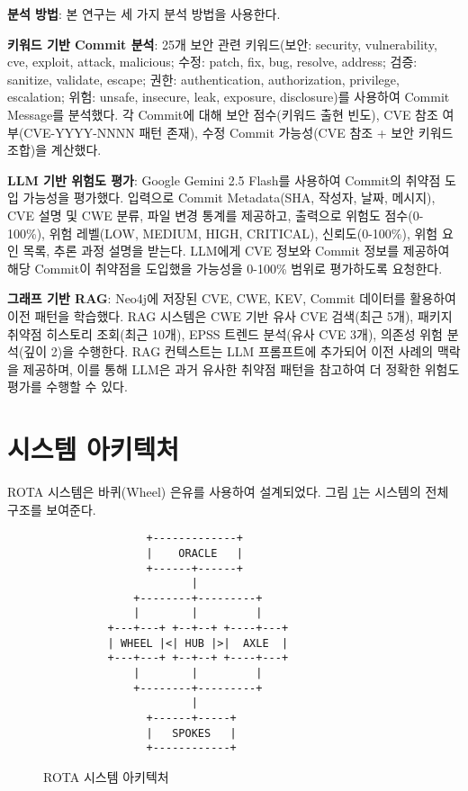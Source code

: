 ﻿\documentclass[conference]{IEEEtran}
\begin{document}
\textbf{분석 방법}: 본 연구는 세 가지 분석 방법을 사용한다.

\textbf{키워드 기반 Commit 분석}: 25개 보안 관련 키워드(보안: security, vulnerability, cve, exploit, attack, malicious; 수정: patch, fix, bug, resolve, address; 검증: sanitize, validate, escape; 권한: authentication, authorization, privilege, escalation; 위험: unsafe, insecure, leak, exposure, disclosure)를 사용하여 Commit Message를 분석했다. 각 Commit에 대해 보안 점수(키워드 출현 빈도), CVE 참조 여부(CVE-YYYY-NNNN 패턴 존재), 수정 Commit 가능성(CVE 참조 + 보안 키워드 조합)을 계산했다.



\textbf{LLM 기반 위험도 평가}: Google Gemini 2.5 Flash를 사용하여 Commit의 취약점 도입 가능성을 평가했다. 입력으로 Commit Metadata(SHA, 작성자, 날짜, 메시지), CVE 설명 및 CWE 분류, 파일 변경 통계를 제공하고, 출력으로 위험도 점수(0-100\%), 위험 레벨(LOW, MEDIUM, HIGH, CRITICAL), 신뢰도(0-100\%), 위험 요인 목록, 추론 과정 설명을 받는다. LLM에게 CVE 정보와 Commit 정보를 제공하여 해당 Commit이 취약점을 도입했을 가능성을 0-100\% 범위로 평가하도록 요청한다.

\textbf{그래프 기반 RAG}: Neo4j에 저장된 CVE, CWE, KEV, Commit 데이터를 활용하여 이전 패턴을 학습했다. RAG 시스템은 CWE 기반 유사 CVE 검색(최근 5개), 패키지 취약점 히스토리 조회(최근 10개), EPSS 트렌드 분석(유사 CVE 3개), 의존성 위험 분석(깊이 2)을 수행한다. RAG 컨텍스트는 LLM 프롬프트에 추가되어 이전 사례의 맥락을 제공하며, 이를 통해 LLM은 과거 유사한 취약점 패턴을 참고하여 더 정확한 위험도 평가를 수행할 수 있다.


\section{시스템 아키텍처}

ROTA 시스템은 바퀴(Wheel) 은유를 사용하여 설계되었다. 그림 \ref{fig:architecture}는 시스템의 전체 구조를 보여준다.

\begin{figure}[h]
\centering
\small
\begin{verbatim}
                +-------------+
                |    ORACLE   |
                +------+------+
                       |
              +--------+---------+
              |        |         |
          +---+---+ +--+--+ +----+---+
          | WHEEL |<| HUB |>|  AXLE  |
          +---+---+ +--+--+ +----+---+
              |        |         |
              +--------+---------+
                       |
                +------+-----+
                |   SPOKES   |
                +------------+
\end{verbatim}
\caption{ROTA 시스템 아키텍처}
\label{fig:architecture}
\end{figure}
\end{document}
